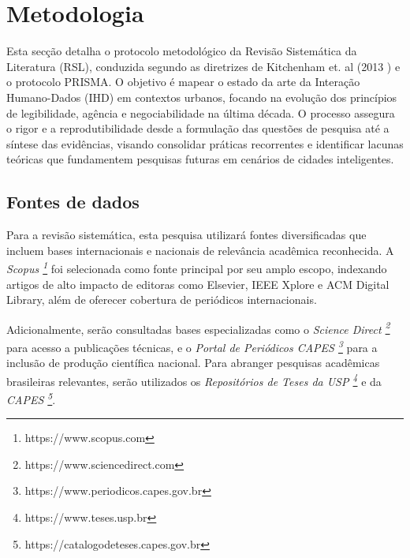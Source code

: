 \documentclass[12pt]{article}
\begin{document}


\section{Metodologia} \label{sec:firstpage}

    Esta secção detalha o protocolo metodológico da Revisão Sistemática da Literatura (RSL), conduzida segundo as diretrizes de Kitchenham et. al (2013 \nocite{KITCHENHAM2013}) e o protocolo PRISMA. O objetivo é mapear o estado da arte da Interação Humano-Dados (IHD) em contextos urbanos, focando na evolução dos princípios de legibilidade, agência e negociabilidade na última década. O processo assegura o rigor e a reprodutibilidade desde a formulação das questões de pesquisa até a síntese das evidências, visando consolidar práticas recorrentes e identificar lacunas teóricas que fundamentem pesquisas futuras em cenários de cidades inteligentes.

\subsection{Fontes de dados}

    Para a revisão sistemática, esta pesquisa utilizará fontes diversificadas que incluem bases internacionais e nacionais de relevância acadêmica reconhecida. A \emph{Scopus \footnote{https://www.scopus.com}} foi selecionada como fonte principal por seu amplo escopo, indexando artigos de alto impacto de editoras como Elsevier, IEEE Xplore e ACM Digital Library, além de oferecer cobertura de periódicos internacionais.

   Adicionalmente, serão consultadas bases especializadas como o \emph{Science Direct \footnote{https://www.sciencedirect.com}} para acesso a publicações técnicas, e o \emph{Portal de Periódicos CAPES \footnote{https://www.periodicos.capes.gov.br}} para a inclusão de produção científica nacional. Para abranger pesquisas acadêmicas brasileiras relevantes, serão utilizados os \emph{Repositórios de Teses da USP \footnote{https://www.teses.usp.br}} e da \emph{CAPES \footnote{https://catalogodeteses.capes.gov.br}}.
\end{document}
